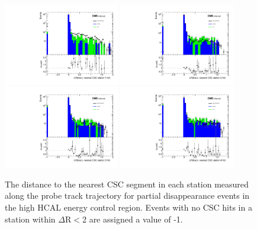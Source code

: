 \begin{figure}[htbp]
	\centering
	\includegraphics[width=0.45\textwidth]{figures/highHcal_cscDr_station0.pdf}
	\hspace{0.01\textwidth}
	\includegraphics[width=0.45\textwidth]{figures/highHcal_cscDr_station1.pdf}
	\vspace{0.01\textwidth}
	\includegraphics[width=0.45\textwidth]{figures/highHcal_cscDr_station2.pdf}
	\hspace{0.01\textwidth}
	\includegraphics[width=0.45\textwidth]{figures/highHcal_cscDr_station3.pdf} 
        \caption[CSC Segment Validation]{The distance to the nearest CSC segment in each station measured along the probe track trajectory for partial disappearance events in the high HCAL energy control region. Events with no CSC hits in a station within $\Delta$R$<$2 are assigned a value of -1.}
	\label{fig:BDTcscvalid}
\end{figure}

